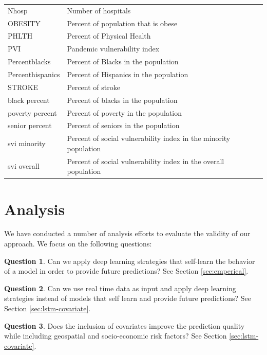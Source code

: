 \documentclass[12pt]{article}
\theoremstyle{definition}
\newtheorem{question}{Question}
\renewcommand{\_}{%
    \textunderscore\hspace{0pt}%
}
\begin{document}
\begin{table}[!hptb]
{\begin{tabular}{ll}
 Nhosp 		  & Number of hospitals\\
 OBESITY 	  & Percent of population that is obese\\
 PHLTH        & Percent of Physical Health\\
 PVI 		  & Pandemic vulnerability index \\
 Percentblacks 	  & Percent of Blacks in the population\\
 Percenthispanics & Percent of Hispanics in the population\\
 STROKE 	  & Percent of stroke\\
 black\_percent	  & Percent of blacks in the population\\
 poverty\_percent & Percent of poverty in the population\\
 senior\_percent  & Percent of seniors in the population\\
 svi\_minority 	  & Percent of social vulnerability index in the minority population\\
 svi\_overall 	  & Percent of social vulnerability index in the overall population\\
\bottomrule
\end{tabular}
}
\end{table}


\section{Analysis}

We have conducted a number of analysis efforts to evaluate the validity of our approach. We focus on the following questions:

\begin{question} Can we apply deep learning strategies that self-learn the behavior of a model in order to provide future predictions? See Section \ref{sec:emperical}.
\label{q:1}
\end{question}

\begin{question} Can we use real time data as input and apply deep learning strategies instead of models that self learn and provide future predictions? See Section \ref{sec:lstm-covariate}.
\label{q:2}
\end{question}

\begin{question} Does the inclusion of covariates improve the prediction quality while including geospatial and socio-economic risk factors? See Section \ref{sec:lstm-covariate}.
\label{q:3}
\end{question}
\end{document}
